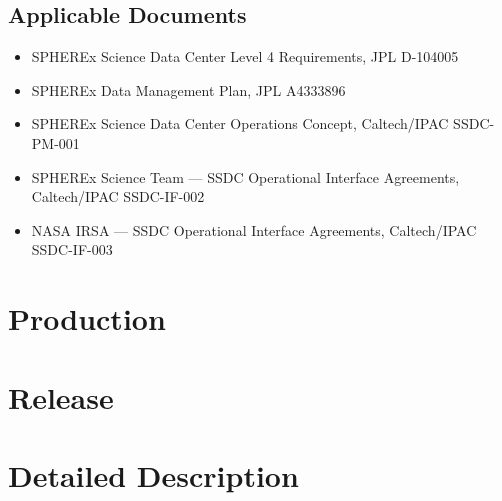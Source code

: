 \documentclass[DP]{spherex}
\begin{document}
\subsection{Applicable Documents}


\begin{itemize}
  \item SPHEREx Science Data Center Level 4 Requirements, JPL D-104005
  \item SPHEREx Data Management Plan, JPL A4333896
  \item SPHEREx Science Data Center Operations Concept, Caltech/IPAC SSDC-PM-001
  \item SPHEREx Science Team --- SSDC Operational Interface Agreements, Caltech/IPAC SSDC-IF-002
  \item NASA IRSA --- SSDC Operational Interface Agreements, Caltech/IPAC SSDC-IF-003
\end{itemize}


\section{Production}



\section{Release}



\section{Detailed Description}

% 




\end{document}
